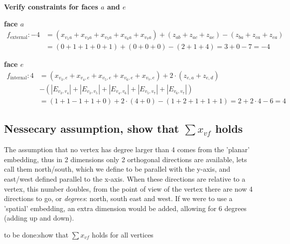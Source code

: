 \textbf{Verify constraints for faces $a$ and $e$}

\textbf{face $a$}
\begin{align*}
  f_{\text{external}}: -4
  &= (x_{v_1a}+x_{v_3a}+x_{v_5a}+x_{v_6a}+x_{v_7a})
   + (z_{ab} + z_{ac} + z_{ae}) - (z_{ba} + z_{ca} + z_{ea})\\
  &= (0+1+1+0+1) + (0+0+0) - (2+1+4)  = 3 + 0 - 7 = -4
\end{align*}

\textbf{face $e$}
\begin{align*}
  f_{\text{internal}}: 4
  &= (x_{v_3,e}+x_{v_4,e}+x_{v_5,e}+x_{v_6,e}+x_{v_7,e})
   + 2 \cdot (z_{e,a} + z_{e,d})\\
  &- (|E_{v_3,v_4}| + |E_{v_3,v_5}| + |E_{v_4,v_6}| + |E_{v_5,v_7}| + |E_{v_6,v_7}|) \\
  &= (1+1-1+1+0) + 2 \cdot (4+0) - (1+2+1+1+1)  = 2 + 2 \cdot 4 - 6 = 4
\end{align*}



\subsection{Nessecary assumption, show that $\sum x_{vf}$ holds}

The assumption that no vertex has degree larger than 4 comes from the 'planar' embedding, thus in 2 dimensions only 2 orthogonal directions are available, lets call them north/south, which we define to be parallel with the y-axis, and east/west defined parallel to the x-axis. When these directions are relative to a vertex, this number doubles, from the point of view of the vertex there are now 4 directions to go, or \textit{degrees}: north, south east and west. If we were to use a 'spatial' embedding, an extra dimension would be added, allowing for 6 degrees (adding up and down).

to be done:show that $\sum{x_{vf}}$ holds for all vertices

